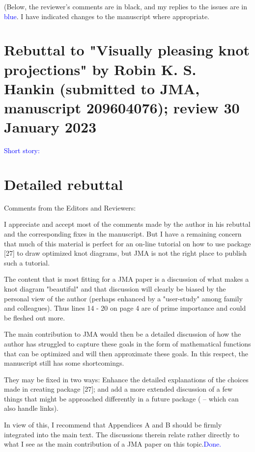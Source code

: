 \documentclass[12pt]{article}
\begin{document}
(Below, the reviewer's comments are in black, and my replies to the
issues are in \textcolor{blue}{blue}.  I have indicated changes to the
manuscript where appropriate.

\section*{Rebuttal to "Visually pleasing knot projections" by
  Robin K. S. Hankin (submitted to JMA, manuscript 209604076); review
  30 January 2023}

\textcolor{blue}{ Short story: }



\section*{Detailed rebuttal}



Comments from the Editors and Reviewers:

I appreciate and accept most of the comments made by the author in his
rebuttal and the corresponding fixes in the manuscript.  But I have a
remaining concern that much of this material is perfect for an on-line
tutorial on how to use package [27] to draw optimized knot diagrams,
but JMA is not the right place to publish such a tutorial.

The content that is most fitting for a JMA paper is a discussion of
what makes a knot diagram "beautiful"  and that discussion will
clearly be biased by the personal view of the author (perhaps enhanced
by a "user-study" among family and colleagues).  Thus lines 14 - 20 on
page 4 are of prime importance and could be fleshed out more.

The main contribution to JMA would then be a detailed discussion of
how the author has struggled to capture these goals in the form of
mathematical functions that can be optimized and will then approximate
these goals.  In this respect, the manuscript still has some
shortcomings.

They may be fixed in two ways: Enhance the detailed explanations of
the choices made in creating package [27]; and add a more extended
discussion of a few things that might be approached differently in a
future package ( -- which can also handle links).

In view of this, I recommend that Appendices A and B should be firmly
integrated into the main text.  The discussions therein relate rather
directly to what I see as the main contribution of a JMA paper on this
topic.\textcolor{blue}{Done.}
\end{document}
